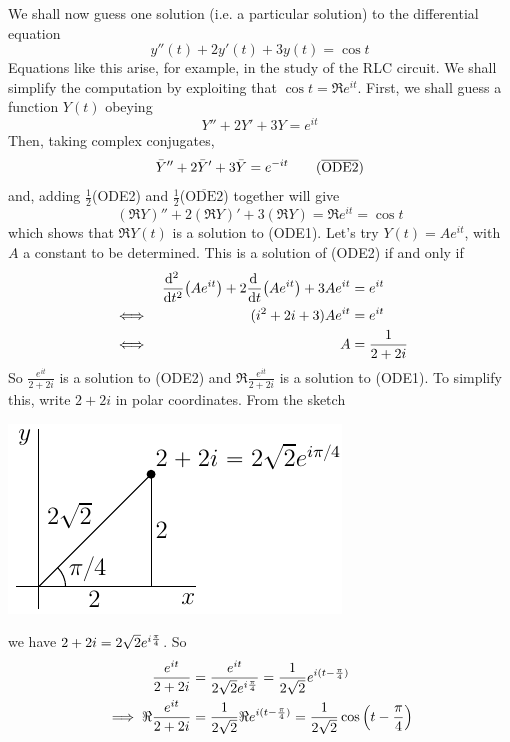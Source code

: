\begin{eg}\label{eg complex ode B}
We shall now guess one solution (i.e. a particular solution)
to the differential equation
\begin{equation*}
y''(t)+2y'(t)+3y(t)=\cos t
\tag{ODE1}\end{equation*}
Equations like this arise, for example, in the  study of the RLC circuit.
We shall simplify the computation by exploiting that $\cos t=\Re e^{it}$.
First, we shall guess a function $Y(t)$ obeying 
\begin{equation*}
Y''+2Y'+3Y=e^{i t}
\tag{ODE2}\end{equation*}
Then, taking complex conjugates,
\begin{equation*}
\bar Y''+2\bar Y'+3\bar Y=e^{-i t}
\tag{$\overline{\text{ODE2}}$}\end{equation*}
and, adding $\frac{1}{2}$(ODE2) and $\frac{1}{2}$($\overline{\text{ODE2}}$) together will
give 
\begin{equation*}
(\Re Y)''+2(\Re Y)'+3(\Re Y)=\Re e^{i t}=\cos t
\end{equation*}
which shows that $\Re Y(t)$ is a solution to (ODE1).
Let's try $Y(t)=Ae^{i t}$, with $A$ a constant to be determined. This is a solution of (ODE2) if and only if
\begin{align*}
& & \difftwo{}{t}\big(Ae^{it}\big)
    +2\diff{}{t}\big(Ae^{it}\big)
    +3Ae^{it}&=e^{it} \\
&\iff& (i^2+2i+3)Ae^{it}&=e^{it} \\
&\iff& A&=\frac{1}{2+2i} 
\end{align*}
So $\frac{e^{it}}{2+2i}$ is a solution to (ODE2) and $\Re \frac{e^{it}}{2+2i}$ 
is a solution to (ODE1). To simplify this, write $2+2i$ in polar coordinates.
From the sketch
\begin{efig}
\begin{center}
   \includegraphics{polar4}
\end{center}
\end{efig}
we have $2+2i=2\sqrt{2}e^{i{\pi\over 4}}$.
So
\begin{align*}
\frac{e^{it}}{2+2i}&=\frac{e^{it}}{2\sqrt{2}e^{i{\pi\over 4}}}
=\frac{1}{2\sqrt{2}}e^{i(t-{\pi\over 4})} \\
\implies \Re\frac{e^{it}}{2+2i}
&=\frac{1}{2\sqrt{2}}\Re e^{i(t-{\pi\over 4})}
=\frac{1}{2\sqrt{2}}\cos\left(t-\frac{\pi}{4}\right)
\end{align*}
\end{eg}









